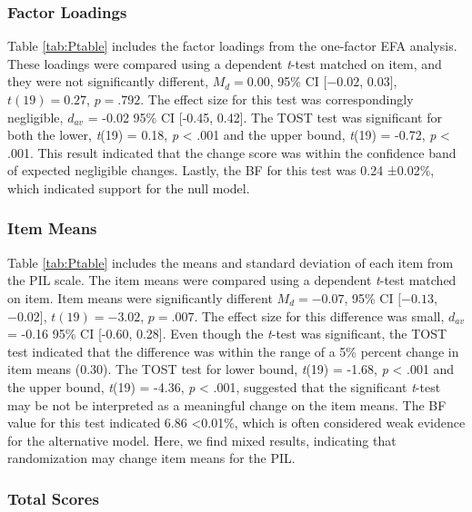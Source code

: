 \documentclass[english,man, mask]{apa6}
\theoremstyle{definition}
\theoremstyle{definition}
\theoremstyle{definition}
\theoremstyle{remark}
\begin{document}
\subsubsection{Factor Loadings}\label{factor-loadings}

Table \ref{tab:Ptable} includes the factor loadings from the one-factor
EFA analysis. These loadings were compared using a dependent
\emph{t}-test matched on item, and they were not significantly
different, \(M_d = 0.00\), 95\% CI \([-0.02\), \(0.03]\),
\(t(19) = 0.27\), \(p = .792\). The effect size for this test was
correspondingly negligible, \(d_{av}\) = -0.02 95\% CI {[}-0.45,
0.42{]}. The TOST test was significant for both the lower, \emph{t}(19)
= 0.18, \emph{p} \textless{} .001 and the upper bound, \emph{t}(19) =
-0.72, \emph{p} \textless{} .001. This result indicated that the change
score was within the confidence band of expected negligible changes.
Lastly, the BF for this test was 0.24 ±0.02\%, which indicated support
for the null model.

\subsubsection{Item Means}\label{item-means}

Table \ref{tab:Ptable} includes the means and standard deviation of each
item from the PIL scale. The item means were compared using a dependent
\emph{t}-test matched on item. Item means were significantly different
\(M_d = -0.07\), 95\% CI \([-0.13\), \(-0.02]\), \(t(19) = -3.02\),
\(p = .007\). The effect size for this difference was small, \(d_{av}\)
= -0.16 95\% CI {[}-0.60, 0.28{]}. Even though the \emph{t}-test was
significant, the TOST test indicated that the difference was within the
range of a 5\% percent change in item means (0.30). The TOST test for
lower bound, \emph{t}(19) = -1.68, \emph{p} \textless{} .001 and the
upper bound, \emph{t}(19) = -4.36, \emph{p} \textless{} .001, suggested
that the significant \emph{t}-test may be not be interpreted as a
meaningful change on the item means. The BF value for this test
indicated 6.86 \textless{}0.01\%, which is often considered weak
evidence for the alternative model. Here, we find mixed results,
indicating that randomization may change item means for the PIL.

\subsubsection{Total Scores}\label{total-scores}
\end{document}
